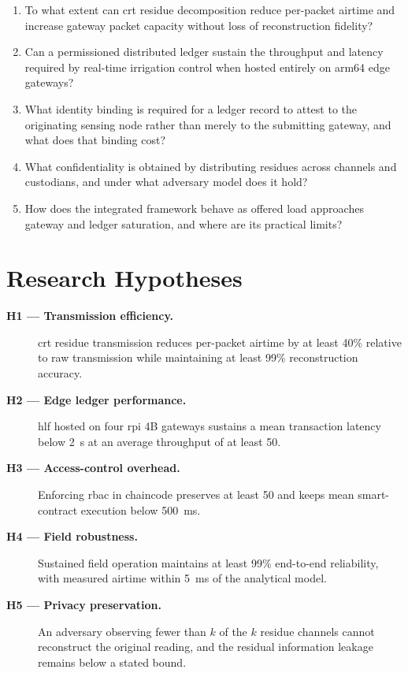\documentclass[12pt,a4paper,oneside]{book}
\begin{document}
\begin{enumerate}[label=\textbf{RQ\arabic*.}]
  \item To what extent can \gls{crt} residue decomposition reduce per-packet
        airtime and increase gateway packet capacity without loss of
        reconstruction fidelity?
  \item Can a permissioned distributed ledger sustain the throughput and latency
        required by real-time irrigation control when hosted entirely on
        \gls{arm64} edge gateways?
  \item What identity binding is required for a ledger record to attest to the
        originating sensing node rather than merely to the submitting gateway,
        and what does that binding cost?
  \item What confidentiality is obtained by distributing residues across
        channels and custodians, and under what adversary model does it hold?
  \item How does the integrated framework behave as offered load approaches
        gateway and ledger saturation, and where are its practical limits?
\end{enumerate}

\section{Research Hypotheses}
\label{sec:hypotheses}

\begin{description}
  \item[\textnormal{\textbf{H1 — Transmission efficiency.}}] \gls{crt} residue
        transmission reduces per-packet airtime by at least 40\% relative to raw
        transmission while maintaining at least 99\% reconstruction accuracy.

  \item[\textnormal{\textbf{H2 — Edge ledger performance.}}] \gls{hlf} hosted on
        four \gls{rpi} 4B gateways sustains a mean transaction latency below
        \SI{2}{\second} at an average throughput of at least \SI{50}{\tps}.

  \item[\textnormal{\textbf{H3 — Access-control overhead.}}] Enforcing
        \gls{rbac} in chaincode preserves at least \SI{50}{\tps} and keeps mean
        smart-contract execution below \SI{500}{\milli\second}.

  \item[\textnormal{\textbf{H4 — Field robustness.}}] Sustained field operation
        maintains at least 99\% end-to-end reliability, with measured airtime
        within \SI{5}{\milli\second} of the analytical model.

  \item[\textnormal{\textbf{H5 — Privacy preservation.}}] An adversary observing
        fewer than $k$ of the $k$ residue channels cannot reconstruct the
        original reading, and the residual information leakage remains below a
        stated bound.
\end{description}
\end{document}

